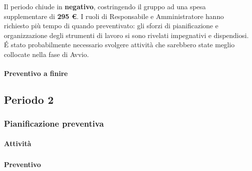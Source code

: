 Il periodo chiude in \textbf{negativo}, costringendo il gruppo ad una spesa supplementare di \textbf{295 \euro}. I ruoli di Responsabile e Amministratore hanno richiesto più tempo di quando preventivato: gli sforzi di pianificazione e organizzazione degli strumenti di lavoro si sono rivelati impegnativi e dispendiosi. \'E stato probabilmente necessario svolgere attività che sarebbero state meglio collocate nella fase di Avvio.



\paragraph{Preventivo a finire}
\subparagraph*{}

\pafTable{
	
}

\pagebreak
\subsection{Periodo 2}

\subsubsection{Pianificazione preventiva}

\paragraph{Attività}
\subparagraph*{}

\planningTable{
	
}



\paragraph{Preventivo}
\subparagraph*{}


